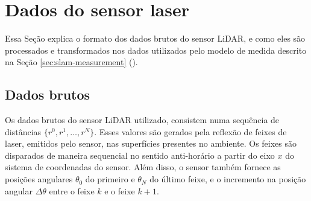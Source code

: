 \section{Dados do sensor laser}
Essa Seção explica o formato dos dados brutos do sensor LiDAR, e como eles 
são processados e transformados nos dados utilizados pelo modelo de medida 
descrito na Seção \ref{sec:slam-measurement} ().

\subsection{Dados brutos}
Os dados brutos do sensor LiDAR utilizado, consistem numa sequência de 
distâncias $\{r^0, r^1, \dots, r^N\}$. Esses valores são gerados pela reflexão de feixes de laser, emitidos pelo sensor, nas superfícies 
presentes no ambiente. Os feixes são disparados de maneira sequencial no 
sentido anti-horário a partir do eixo $x$ do sistema de coordenadas do sensor. 
Além disso, o sensor também fornece as posições angulares $\theta_0$ 
do primeiro e $\theta_N$ do último feixe, e o incremento na posição angular $\Delta \theta$ entre o feixe $k$ e o feixe $k+1$.

